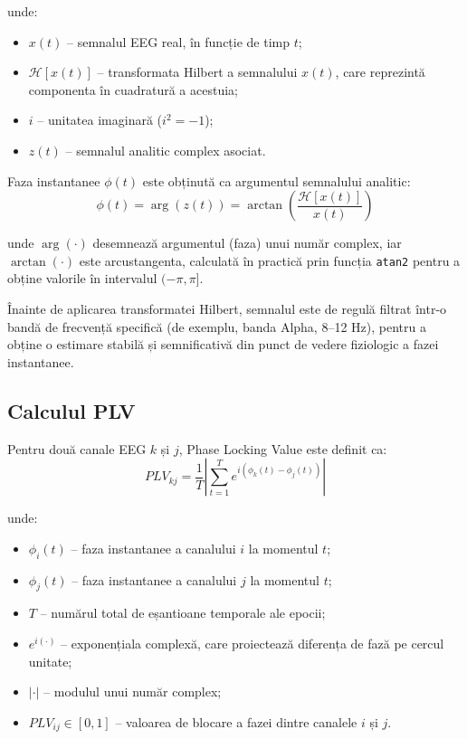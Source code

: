 \documentclass[12pt,a4paper]{report}
\theoremstyle{definition}
\theoremstyle{remark}
\begin{document}
\noindent unde:
\begin{itemize}
    \item $x(t)$ -- semnalul EEG real, în funcție de timp $t$;
    \item $\mathcal{H}[x(t)]$ -- transformata Hilbert a semnalului $x(t)$, care reprezintă componenta în cuadratură a acestuia;
    \item $i$ -- unitatea imaginară ($i^2 = -1$);
    \item $z(t)$ -- semnalul analitic complex asociat.
\end{itemize}

Faza instantanee $\phi(t)$ este obținută ca argumentul semnalului analitic:
\begin{equation}
    \phi(t) = \arg(z(t)) = \arctan\left(\frac{\mathcal{H}[x(t)]}{x(t)}\right)
    \label{eq:instantaneous_phase}
\end{equation}

\noindent unde $\arg(\cdot)$ desemnează argumentul (faza) unui număr complex, iar $\arctan(\cdot)$ este arcustangenta, calculată în practică prin funcția \texttt{atan2} pentru a obține valorile în intervalul $(-\pi, \pi]$.

Înainte de aplicarea transformatei Hilbert, semnalul este de regulă filtrat într-o bandă de frecvență specifică (de exemplu, banda Alpha, 8--12 Hz), pentru a obține o estimare stabilă și semnificativă din punct de vedere fiziologic a fazei instantanee.

\subsection{Calculul PLV}

Pentru două canale EEG $k$ și $j$, Phase Locking Value este definit ca:
\begin{equation}
    PLV_{kj} = \frac{1}{T} \left| \sum_{t=1}^{T} e^{i(\phi_k(t) - \phi_j(t))} \right|
    \label{eq:plv}
\end{equation}

\noindent unde:
\begin{itemize}
    \item $\phi_i(t)$ -- faza instantanee a canalului $i$ la momentul $t$;
    \item $\phi_j(t)$ -- faza instantanee a canalului $j$ la momentul $t$;
    \item $T$ -- numărul total de eșantioane temporale ale epocii;
    \item $e^{i(\cdot)}$ -- exponențiala complexă, care proiectează diferența de fază pe cercul unitate;
    \item $|\cdot|$ -- modulul unui număr complex;
    \item $PLV_{ij} \in [0, 1]$ -- valoarea de blocare a fazei dintre canalele $i$ și $j$.
\end{itemize}
\end{document}
